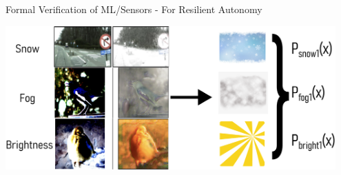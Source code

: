 \documentclass[t,compress,aspectratio=169]{beamer}
\begin{document}
\begin{frame}[fragile]{Formal Verification of ML/Sensors - For Resilient Autonomy}
%	
%	
%	
%	

\vspace{-0.2em}

\centering\includegraphics[width=0.95\textwidth]{img/guarantee-weather}
	
\end{frame}
\end{document}

